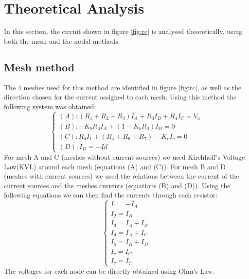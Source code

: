 \section{Theoretical Analysis}
\label{sec:analysis}

In this section, the circuit shown in figure \ref{fig:rc} is analysed
theoretically, using both the mesh and the nodal methods.


\subsection{Mesh method}
The 4 meshes used for this method are identified in figure \ref{fig:rc}, as well as the direction chosen for the current assigned to each mesh.
Using this method the following system was obtained:
\begin{equation}
  \begin{cases}
    \left(A\right): \left(R_{1}+R_{2}+R_{3}\right)I_{A}+R_{3}I_{B}+R_{4}I_{C}=V_{a} \\
    \left(B\right): -K_{b}R_{3}I_{A}+\left(1-K_{b}R_{3}\right)I_{B}=0               \\
    \left(C\right): R_{4}I_{1}+\left(R_{4}+R_{6}+R_{7} \right) -K_{c}I_{c}=0        \\
    \left(D\right): I_{D}=-Id
  \end{cases}
\end{equation}
For mesh A and C (meshes without current sources) we used Kirchhoff's Voltage Law(KVL) around each mesh (equations (A) and (C)).
For mesh B and D (meshes with current sources) we used the relations between the current of the current sources and the meshes currents (equations (B) and (D)).
Using the following equations we can then find the currents through each resistor:
\begin{equation}
  \begin{cases}
    I_{1}=-I_{A}      \\
    I_{2}=I_{B}       \\
    I_{3}=I_{A}+I_{B} \\
    I_{4}=I_{A}+I_{C} \\
    I_{5}=I_{B}+I_{D} \\
    I_{c}=I_{C}       \\
    I_{7}=I_{C}
  \end{cases}
\end{equation}
The voltages for each node can be directly obtained using Ohm's Law.

